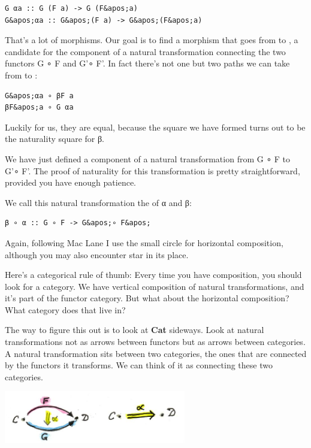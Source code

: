 \begin{verbatim}
G αa :: G (F a) -> G (F&apos;a)
G&apos;αa :: G&apos;(F a) -> G&apos;(F&apos;a)
\end{verbatim}

That's a lot of morphisms. Our goal is to find a morphism that goes from
 to , a candidate for the
component of a natural transformation connecting the two functors G ∘ F
and G'∘ F'. In fact there's not one but two paths we can take from
 to :

\begin{verbatim}
G&apos;αa ∘ βF a
βF&apos;a ∘ G αa
\end{verbatim}

Luckily for us, they are equal, because the square we have formed turns
out to be the naturality square for β.

We have just defined a component of a natural transformation from G ∘ F
to G'∘ F'. The proof of naturality for this transformation is pretty
straightforward, provided you have enough patience.

We call this natural transformation the  of
α and β:

\begin{verbatim}
β ∘ α :: G ∘ F -> G&apos;∘ F&apos;
\end{verbatim}

Again, following Mac Lane I use the small circle for horizontal
composition, although you may also encounter star in its place.

Here's a categorical rule of thumb: Every time you have composition, you
should look for a category. We have vertical composition of natural
transformations, and it's part of the functor category. But what about
the horizontal composition? What category does that live in?

The way to figure this out is to look at \textbf{Cat} sideways. Look at
natural transformations not as arrows between functors but as arrows
between categories. A natural transformation sits between two
categories, the ones that are connected by the functors it transforms.
We can think of it as connecting these two categories.

\includegraphics[width=3.12500in]{images/sideways.jpg}

